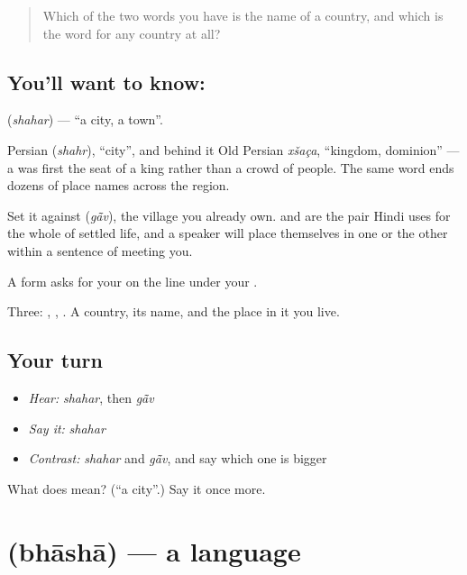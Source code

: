 \begin{quote}
Which of the two words you have is the name of a country, and which is the word for any country at all?
\end{quote}

\subsection*{You'll want to know: }
\textbf{} (\emph{shahar}) — \textquotedblleft{}a city, a town\textquotedblright{}.

Persian  (\emph{shahr}), \textquotedblleft{}city\textquotedblright{}, and behind it Old Persian \emph{xšaça}, \textquotedblleft{}kingdom, dominion\textquotedblright{} — a  was first the seat of a king rather than a crowd of people. The same word ends dozens of place names across the region.

Set it against \textbf{} (\emph{gā̃v}), the village you already own.  and  are the pair Hindi uses for the whole of settled life, and a speaker will place themselves in one or the other within a sentence of meeting you.

A form asks for your  on the line under your .

\begin{grammarlens}[title={What you've built}]
Three: , , . A country, its name, and the place in it you live.
\end{grammarlens}

\subsection*{Your turn}
\begin{itemize}
\raggedright
  \item \emph{Hear:} \emph{shahar}, then \emph{gā̃v}
  \item \emph{Say it:} \emph{shahar}
  \item \emph{Contrast:} \emph{shahar} and \emph{gā̃v}, and say which one is bigger
\end{itemize}

\begin{tcolorbox}[breakable,colback=teal!4,colframe=teal!35!black,title={Before you move on}]
What does  mean? (\textquotedblleft{}a city\textquotedblright{}.) Say it once more.
\end{tcolorbox}
\section[\texorpdfstring{\hi{भाषा} (bhāshā)}{भाषा (bhāshā)}]{ (bhāshā) — a language}

